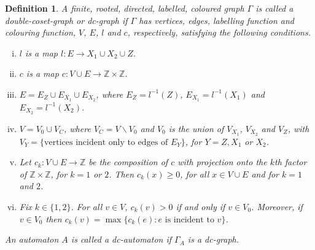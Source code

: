 \documentclass[a4paper,12pt]{article}
\newcommand{\G}{\Gamma }
\newtheorem{definition}[theorem]{Definition}
\numberwithin{equation}{section}
\numberwithin{figure}{section}
\newcommand{\ZZ}{\ensuremath{\mathbb{Z}}}
\newcommand{\maps}{\rightarrow}
\newcommand{\bs}{\backslash}
\newcommand{\be}{\begin{enumerate}}
\newcommand{\ee}{\end{enumerate}}
\begin{document}
\begin{definition}
A finite, rooted, directed, labelled, coloured graph $\G$ is called a 
{\em double-coset-graph} or 
{\em dc-graph}
if $\G$ has vertices, edges, labelling function and colouring function,
 $V$, $E$, $l$ and $c$, 
respectively, satisfying the following conditions.
\be[(i)]
\item $l$ is a map $l:E\maps X_1\cup X_2\cup Z$.
\item $c$ is a map $c:V\cup E\maps \ZZ\times \ZZ$. 
\item $E=E_Z\cup E_{X_1}\cup E_{X_2}$,
where $E_Z=l^{-1}(Z)$, $E_{X_1}=l^{-1}(X_1)$ and $E_{X_2}=l^{-1}(X_2)$.
\item $V=V_0\cup V_C$, where $V_C=V\bs V_0$ and 
$V_0$ is the union of 
$V_{X_1}$, $V_{X_2}$ and $V_Z$, with   
$V_Y=\{\textrm{vertices incident only to edges of } E_Y\}$, for $Y=Z,X_1$ or $X_2$. 
\item Let $c_k:V\cup E\maps \ZZ$ be the composition of $c$ with projection
onto the $k$th factor of $\ZZ\times \ZZ$, for $k=1$ or $2$. Then 
$c_k(x)\ge 0$, for all $x\in V\cup E$ and  for $k=1$ and $2$. 
\item Fix $k\in \{1,2\}$.  For all $v\in V$,  
$c_k(v)>0$ if and only if $v\in V_0$. Moreover, if $v\in V_0$ then
$c_k(v)=\max\{c_k(e): e \textrm{ is incident to } v\}$. 
\ee
An automaton $A$ is called a {\em dc-automaton} if $\G_A$ is  a dc-graph.
\end{definition}
\end{document}
